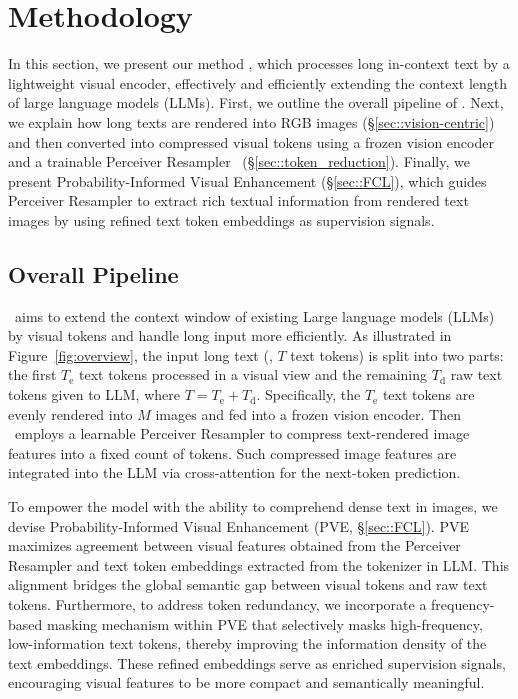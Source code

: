 
\section{Methodology}
\label{sec::method}



In this section, we present our method \ourname, which processes long in-context text by a lightweight visual encoder, effectively and efficiently extending the context length of large language models (LLMs).  
First, we outline the overall pipeline of \ourname. 
Next, we explain how long texts are rendered into RGB images (\S\ref{sec::vision-centric}) and then converted into compressed visual tokens using a frozen vision encoder and a trainable Perceiver Resampler~\cite{alayrac2022flamingo} (\S\ref{sec::token_reduction}). 
Finally, we present Probability-Informed Visual Enhancement (\S\ref{sec::FCL}), which guides Perceiver Resampler to extract rich textual information from rendered text images by using refined text token embeddings as supervision signals. 


\subsection{Overall Pipeline}

\ourname\ aims to extend the context window of existing Large language models (LLMs) by visual tokens and handle long input more efficiently. 
As illustrated in Figure~\ref{fig:overview}, the input long text (\ie, $T$ text tokens) is split into two parts: the first $T_\text{e}$ text tokens processed in a visual view and the remaining $T_\text{d}$ raw text tokens given to LLM, where $T = T_\text{e} + T_\text{d}$.  
Specifically, the $T_\text{e}$ text tokens are evenly rendered into $M$ images and fed into a frozen vision encoder. Then \ourname\ employs a learnable Perceiver Resampler to compress text-rendered image features into a fixed count of tokens. Such compressed image features are integrated into the LLM via cross-attention for the next-token prediction. 


To empower the model with the ability to comprehend dense text in images, we devise Probability-Informed Visual Enhancement (PVE, \S\ref{sec::FCL}). 
PVE maximizes agreement between visual features obtained from the Perceiver Resampler and text token embeddings extracted from the tokenizer in LLM. 
This alignment bridges the global semantic gap between visual tokens and raw text tokens. 
Furthermore, to address token redundancy, we incorporate a frequency-based masking mechanism within PVE that selectively masks high-frequency, low-information text tokens, thereby improving the information density of the text embeddings. 
These refined embeddings serve as enriched supervision signals, encouraging visual features to be more compact and semantically meaningful. 



